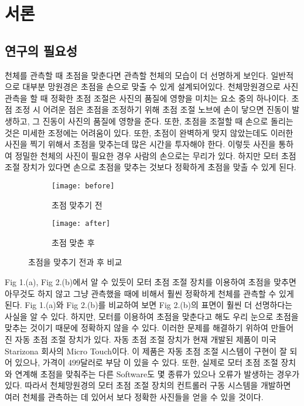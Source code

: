 \section{서론}

\subsection{연구의 필요성}

천체를 관측할 때 초점을 맞춘다면 관측할 천체의 모습이 더 선명하게 보인다. 일반적으로 대부분 망원경은 초점을 손으로 맞출 수 있게 설계되어있다. 천체망원경으로 사진 관측을 할 때 정확한 초점 조절은 사진의 품질에 영향을 미치는 요소 중의 하나이다. 초점 조정 시 어려운 점은 초점을 조정하기 위해 초점 조절 노브에 손이 닿으면 진동이 발생하고, 그 진동이 사진의 품질에 영향을 준다. 또한, 초점을 조절할 때 손으로 돌리는 것은 미세한 조정에는 어려움이 있다. 또한, 초점이 완벽하게 맞지 않았는데도 이러한 사진을 찍기 위해서 초점을 맞추는데 많은 시간을 투자해야 한다. 이렇듯 사진을 통하여 정밀한 천체의 사진이 필요한 경우 사람의 손으로는 무리가 있다. 하지만 모터 초점 조절 장치가 있다면 손으로 초점을 맞추는 것보다 정확하게 초점을 맞출 수 있게 된다. 
\begin{figure}[h]
	\begin{subfigure}{0.5\textwidth}
		\texttt{[image: before]} 
		\caption{초점 맞추기 전}
		\label{fig:before}
	\end{subfigure}
	\begin{subfigure}{0.5\textwidth}
		\texttt{[image: after]}
		\caption{초점 맞춘 후}
		\label{fig:after}
	\end{subfigure}
	\caption{초점을 맞추기 전과 후 비교}
	\label{fig:image1}
\end{figure}
Fig 1.(a), Fig 2.(b)에서 알 수 있듯이 모터 초점 조절 장치를 이용하여 초점을 맞추면 아무것도 하지 않고 그냥 관측했을 때에 비해서 훨씬 정확하게 천체를 관측할 수 있게 된다. Fig 1.(a)와 Fig 2.(b)를 비교하여 보면 Fig 2.(b)의 표면이 훨씬 더 선명하다는 사실을 알 수 있다. 하지만, 모터를 이용하여 초점을 맞춘다고 해도 우리 눈으로 초점을 맞추는 것이기 때문에 정확하지 않을 수 있다. 이러한 문제를 해결하기 위하여 만들어진 자동 초점 조절 장치가 있다. 자동 초점 조절 장치가 현재 개발된 제품이 미국 Starizona 회사의 Micro Touch이다. 이 제품은 자동 초점 조절 시스템이 구현이 잘 되어 있으나, 가격이 499달러로 부담 이 있을 수 있다. 또한, 실제로 모터 초점 조절 장치와 연계해 초점을 맞춰주는 다른 Software도 몇 종류가 있으나 오류가 발생하는 경우가 있다. 따라서 천체망원경의 모터 초점 조절 장치의 컨트롤러 구동 시스템을 개발하면 여러 천체를 관측하는 데 있어서 보다 정확한 사진들을 얻을 수 있을 것이다.

